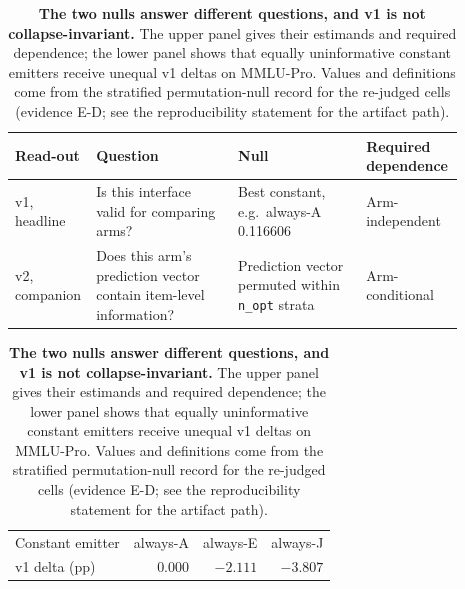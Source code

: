 \begin{table}[!htbp]
\centering
\small
\setlength{\tabcolsep}{4pt}
\begin{tabular}{p{0.12\linewidth}p{0.31\linewidth}p{0.29\linewidth}p{0.17\linewidth}}
\toprule
Read-out & Question & Null & Required dependence \\
\midrule
v1, headline & Is this interface valid for comparing arms? & Best constant, e.g.\ always-A 0.116606 & Arm-independent \\
v2, companion & Does this arm's prediction vector contain item-level information? & Prediction vector permuted within \texttt{n\_opt} strata & Arm-conditional \\
\bottomrule
\end{tabular}

\vspace{4pt}
\begin{tabular}{@{}lrrr@{}}
\toprule
Constant emitter & always-A & always-E & always-J \\
v1 delta (pp) & 0.000 & $-2.111$ & $-3.807$ \\
\bottomrule
\end{tabular}
\caption{\textbf{The two nulls answer different questions, and v1 is not collapse-invariant.} The upper panel gives their estimands and required dependence; the lower panel shows that equally uninformative constant emitters receive unequal v1 deltas on MMLU-Pro. Values and definitions come from the stratified permutation-null record for the re-judged cells (evidence \textsf{E-D}; see the reproducibility statement for the artifact path).}
\label{tab:two-nulls}
\end{table}

